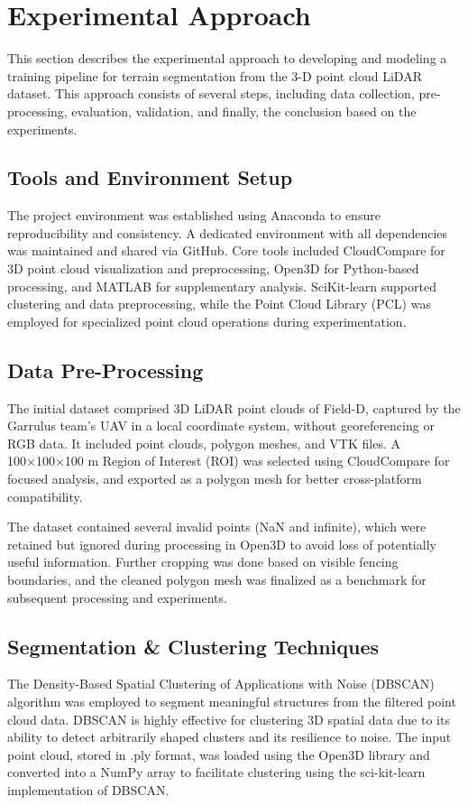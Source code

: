 \documentclass[../report.tex]{subfiles}
\begin{document}
    \section{Experimental Approach}
    This section describes the experimental approach to developing and modeling a training pipeline for terrain segmentation from the 3-D point cloud LiDAR dataset. This approach consists of several steps, including data collection, pre-processing, evaluation, validation, and finally, the conclusion based on the experiments.
    
    \subsection{Tools and Environment Setup}
    The project environment was established using Anaconda to ensure reproducibility and consistency. A dedicated environment with all dependencies was maintained and shared via GitHub. Core tools included CloudCompare for 3D point cloud visualization and preprocessing, Open3D for Python-based processing, and MATLAB for supplementary analysis. SciKit-learn supported clustering and data preprocessing, while the Point Cloud Library (PCL) was employed for specialized point cloud operations during experimentation.

    \subsection{Data Pre-Processing}
    The initial dataset comprised 3D LiDAR point clouds of Field-D, captured by the Garrulus team’s UAV in a local coordinate system, without georeferencing or RGB data. It included point clouds, polygon meshes, and VTK files. A 100×100×100 m Region of Interest (ROI) was selected using CloudCompare for focused analysis, and exported as a polygon mesh for better cross-platform compatibility.

    The dataset contained several invalid points (NaN and infinite), which were retained but ignored during processing in Open3D to avoid loss of potentially useful information. Further cropping was done based on visible fencing boundaries, and the cleaned polygon mesh was finalized as a benchmark for subsequent processing and experiments.
    
    \subsection{Segmentation & Clustering Techniques}
    The Density-Based Spatial Clustering of Applications with Noise (DBSCAN)\cite{DBSCan_Grammarly} algorithm was employed to segment meaningful structures from the filtered point cloud data. DBSCAN is highly effective for clustering 3D spatial data due to its ability to detect arbitrarily shaped clusters and its resilience to noise. The input point cloud, stored in .ply format, was loaded using the Open3D library and converted into a NumPy array to facilitate clustering using the sci-kit-learn implementation of DBSCAN.
    
\end{document}
